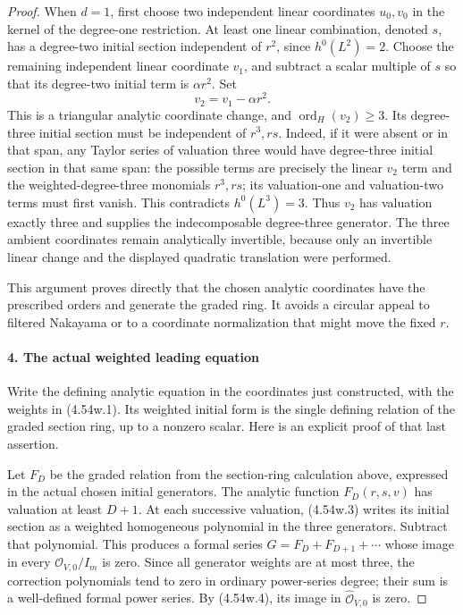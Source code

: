 \begin{proof}
When \(d=1\), first choose two independent linear coordinates
\(u_0,v_0\) in the kernel of the degree-one restriction.
At least one linear combination, denoted \(s\), has a
degree-two initial section independent of \(r^2\), since
\(h^0(L^2)=2\). Choose the remaining independent linear
coordinate \(v_1\), and subtract a scalar multiple of \(s\)
so that its degree-two initial term is \(\alpha r^2\).
Set
\[
                         v_2=v_1-\alpha r^2.
\]
This is a triangular analytic coordinate change, and
\(\operatorname{ord}_H(v_2)\ge3\). Its degree-three
initial section must be independent of \(r^3,rs\).
Indeed, if it were absent or in that span, any Taylor series
of valuation three would have degree-three initial section
in that same span: the possible terms are precisely the
linear \(v_2\) term and the weighted-degree-three monomials
\(r^3,rs\); its valuation-one and valuation-two terms
must first vanish. This contradicts \(h^0(L^3)=3\).
Thus \(v_2\) has valuation exactly three and supplies the
indecomposable degree-three generator. The three ambient
coordinates remain analytically invertible, because only
an invertible linear change and the displayed quadratic
translation were performed.

This argument proves directly that the chosen analytic
coordinates have the prescribed orders and generate the
graded ring. It avoids a circular appeal to filtered
Nakayama or to a coordinate normalization that might move
the fixed \(r\).

\paragraph{4. The actual weighted leading equation}

Write the defining analytic equation in the coordinates just
constructed, with the weights in (4.54w.1). Its weighted initial
form is the single defining relation of the graded section
ring, up to a nonzero scalar. Here is an explicit proof of that
last assertion.

Let \(F_D\) be the graded relation from the section-ring calculation above, expressed
in the actual chosen initial generators. The analytic function
\(F_D(r,s,v)\) has valuation at least \(D+1\).
At each successive valuation, (4.54w.3) writes its initial
section as a weighted homogeneous polynomial in the three
generators. Subtract that polynomial. This produces a formal
series \(G=F_D+F_{D+1}+\cdots\) whose image in every
\(\mathcal O_{V,0}/I_m\) is zero. Since all generator
weights are at most three, the correction polynomials tend
to zero in ordinary power-series degree; their sum is a
well-defined formal power series. By (4.54w.4), its image in
\(\widehat{\mathcal O}_{V,0}\) is zero.


\end{proof}
